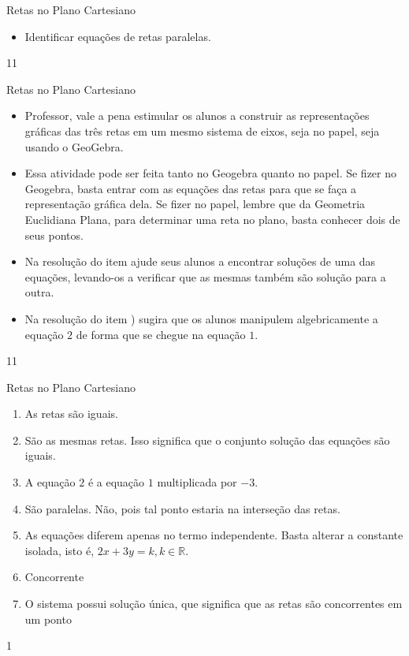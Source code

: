 \clearpage
\def\currentcolor{session1}
\begin{objectives}{Retas no Plano Cartesiano}
{
\begin{itemize}
\item Identificar equações de retas paralelas.
\end{itemize}
}{1}{1}
\end{objectives}
\begin{sugestions}{Retas no Plano Cartesiano}
{
\begin{itemize}
\item Professor, vale a pena estimular os alunos a construir as representações gráficas das três retas em um mesmo sistema de eixos, seja no papel, seja usando o GeoGebra.
\item Essa atividade pode ser feita tanto no Geogebra quanto no papel. Se fizer no Geogebra, basta entrar com as equações das retas para que se faça a representação gráfica dela. Se fizer no papel, lembre que da Geometria Euclidiana Plana,  para determinar uma reta no plano, basta conhecer dois de seus pontos.  
\item Na resolução do item  ajude seus alunos a encontrar soluções de uma das equações, levando-os a verificar que as mesmas também são solução para a outra.
\item Na resolução do item ) sugira que os alunos manipulem algebricamente a equação $2$ de forma que se chegue na equação $1$.
\end{itemize}
}{1}{1}
\end{sugestions}
\begin{answer}{Retas no Plano Cartesiano}
{
\begin{enumerate}
\item As retas são iguais.
\item São as mesmas retas. Isso significa que o conjunto solução das equações são iguais.
\item A equação $2$ é a equação $1$ multiplicada por $-3.$
\item São paralelas. Não, pois tal ponto estaria na interseção das retas.
\item As equações diferem apenas no termo independente. Basta alterar a constante isolada, isto é, $2x+3y=k, k\in \mathbb{R}$.
\item Concorrente
\item O sistema possui solução única, que significa que as retas são concorrentes em um ponto
\end{enumerate}
}{1}
\end{answer}
\label{\detokenize{AF107-4:explorando-posiçoes-relativas}}\label{\detokenize{AF107-4::doc}}

